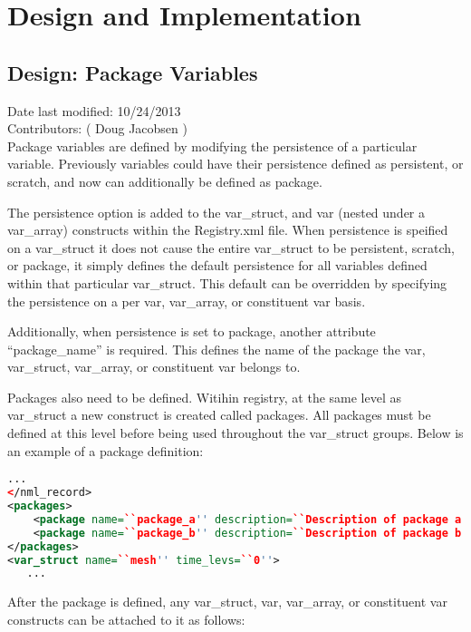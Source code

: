 \documentclass[11pt]{report}
\begin{document}

\chapter{Design and Implementation}
\section{Design: Package Variables}
Date last modified: 10/24/2013 \\
Contributors: ( Doug Jacobsen ) \\

Package variables are defined by modifying the persistence of a particular
variable. Previously variables could have their persistence defined as
persistent, or scratch, and now can additionally be defined as package.

The persistence option is added to the var\_struct, and var (nested under a
var\_array) constructs within the Registry.xml file. When persistence is
speified on a var\_struct it does not cause the entire var\_struct to be
persistent, scratch, or package, it simply defines the default persistence for
all variables defined within that particular var\_struct. This default can be
overridden by specifying the persistence on a per var, var\_array, or
constituent var basis.

Additionally, when persistence is set to package, another attribute
``package\_name'' is required. This defines the name of the package the var,
var\_struct, var\_array, or constituent var belongs to.

Packages also need to be defined. Witihin registry, at the same level as
var\_struct a new construct is created called packages. All packages must be
defined at this level before being used throughout the var\_struct groups.
Below is an example of a package definition:

{\scriptsize
\begin{lstlisting}[language=XML]
   ...
</nml_record>
<packages>
	<package name=``package_a'' description=``Description of package a''/>
	<package name=``package_b'' description=``Description of package b''/>
</packages>
<var_struct name=``mesh'' time_levs=``0''>
   ...
\end{lstlisting}
}

After the package is defined, any var\_struct, var, var\_array, or constituent
var constructs can be attached to it as follows:
\end{document}
